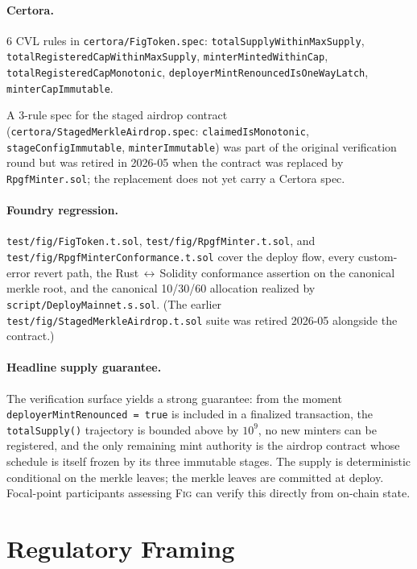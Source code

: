 \documentclass[11pt,a4paper]{article}
\theoremstyle{definition}
\theoremstyle{remark}
\newcommand{\fig}{\textsc{Fig}}
\begin{document}
\paragraph{Certora.}
6 CVL rules in \texttt{certora/FigToken.spec}:
\texttt{totalSupplyWithinMaxSupply},
\texttt{totalRegisteredCapWithinMaxSupply},
\texttt{minterMintedWithinCap},
\texttt{totalRegisteredCapMonotonic},
\texttt{deployerMintRenouncedIsOneWayLatch},
\texttt{minterCapImmutable}.

A 3-rule spec for the staged airdrop contract
(\texttt{certora/StagedMerkleAirdrop.spec}: \texttt{claimedIsMonotonic},
\texttt{stageConfigImmutable}, \texttt{minterImmutable}) was part of
the original verification round but was retired in 2026-05 when
the contract was replaced by \texttt{RpgfMinter.sol}; the
replacement does not yet carry a Certora spec.

\paragraph{Foundry regression.}
\texttt{test/fig/FigToken.t.sol}, \texttt{test/fig/RpgfMinter.t.sol},
and \texttt{test/fig/RpgfMinterConformance.t.sol} cover the deploy
flow, every custom-error revert path, the
Rust\,$\leftrightarrow$\,Solidity conformance assertion on the
canonical merkle root, and the canonical 10/30/60 allocation realized
by \texttt{script/DeployMainnet.s.sol}. (The earlier
\texttt{test/fig/StagedMerkleAirdrop.t.sol} suite was retired
2026-05 alongside the contract.)

\paragraph{Headline supply guarantee.}
The verification surface yields a strong guarantee: from the
moment \texttt{deployerMintRenounced = true} is included in a
finalized transaction, the \texttt{totalSupply()} trajectory is
bounded above by $10^9$, no new minters can be registered, and
the only remaining mint authority is the airdrop contract whose
schedule is itself frozen by its three immutable stages. The
supply is deterministic conditional on the merkle leaves; the
merkle leaves are committed at deploy. Focal-point participants
assessing \fig{} can verify this directly from on-chain state.

\section{Regulatory Framing}
\label{sec:regulatory}
\end{document}

